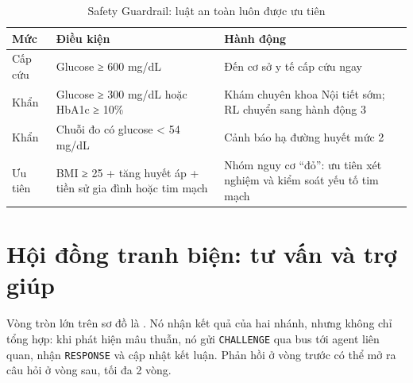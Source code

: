 \begin{table}[H]
\centering
\caption{Safety Guardrail: luật an toàn luôn được ưu tiên}
\label{tab:guardrail}
\small
\begin{tabularx}{\linewidth}{@{}L{2.4cm}L{6.0cm}Y@{}}
\toprule
\textbf{Mức} & \textbf{Điều kiện} & \textbf{Hành động} \\
\midrule
Cấp cứu & Glucose ≥ 600 mg/dL & Đến cơ sở y tế cấp cứu ngay \\
Khẩn & Glucose ≥ 300 mg/dL hoặc HbA1c ≥ 10\% & Khám chuyên khoa Nội tiết sớm; RL chuyển sang hành động 3 \\
Khẩn & Chuỗi đo có glucose < 54 mg/dL & Cảnh báo hạ đường huyết mức 2 \\
Ưu tiên & BMI ≥ 25 + tăng huyết áp + tiền sử gia đình hoặc tim mạch & Nhóm nguy cơ ``đỏ'': ưu tiên xét nghiệm và kiểm soát yếu tố tim mạch \\
\bottomrule
\end{tabularx}
\end{table}

\section{Hội đồng tranh biện: tư vấn và trợ giúp}
\label{sec:council}

Vòng tròn lớn trên sơ đồ là . Nó nhận kết quả của hai nhánh, nhưng không chỉ tổng hợp: khi phát hiện mâu thuẫn, nó gửi \texttt{CHALLENGE} qua bus tới agent liên quan, nhận \texttt{RESPONSE} và cập nhật kết luận. Phản hồi ở vòng trước có thể mở ra câu hỏi ở vòng sau, tối đa 2 vòng.

